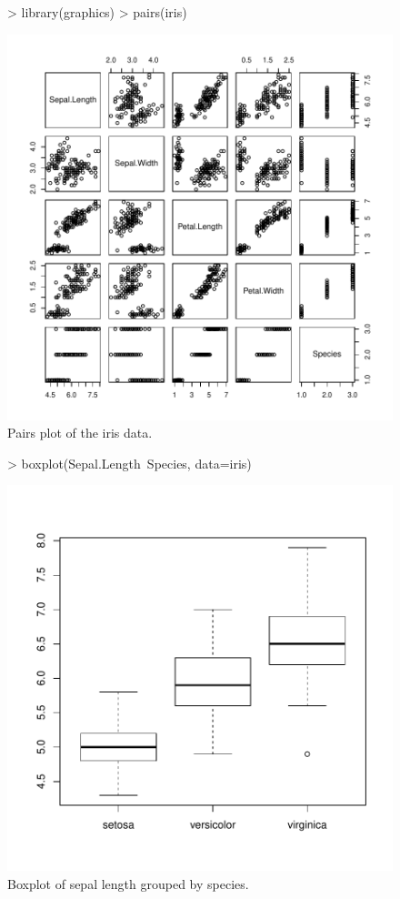 \documentclass[a4paper]{article}
\begin{document}
\begin{figure}[htbp]
  \begin{center}
\begin{Schunk}
\begin{Sinput}
> library(graphics)
> pairs(iris)
\end{Sinput}
\end{Schunk}
\includegraphics{SweaveTest2-006}
     \caption{Pairs plot of the iris data.}
  \end{center}
\end{figure}

\begin{figure}[htbp]
  \begin{center}
\begin{Schunk}
\begin{Sinput}
> boxplot(Sepal.Length~Species, data=iris)
\end{Sinput}
\end{Schunk}
\includegraphics{SweaveTest2-007}
    \caption{Boxplot of sepal length grouped by species.}
  \end{center}
\end{figure}
\end{document}
